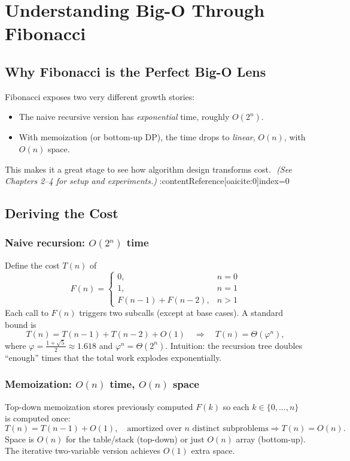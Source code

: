 \chapter{Understanding Big-O Through Fibonacci}
\label{ch:big-o-fib}

\section{Why Fibonacci is the Perfect Big-O Lens}
Fibonacci exposes two very different growth stories:
\begin{itemize}
  \item The naive recursive version has \emph{exponential} time, roughly $O(2^n)$.
  \item With memoization (or bottom-up DP), the time drops to \emph{linear}, $O(n)$, with $O(n)$ space.
\end{itemize}
This makes it a great stage to see how algorithm design transforms cost. \,\,\textit{(See Chapters 2--4 for setup and experiments.)} :contentReference[oaicite:0]{index=0}

\section{Deriving the Cost}
\subsection{Naive recursion: $O(2^n)$ time}
Define the cost $T(n)$ of
\[
F(n)=
\begin{cases}
0,& n=0\\
1,& n=1\\
F(n-1)+F(n-2),& n>1
\end{cases}
\]
Each call to $F(n)$ triggers two subcalls (except at base cases). A standard bound is
\[
T(n)=T(n-1)+T(n-2)+O(1) \quad \Rightarrow \quad T(n)=\Theta(\varphi^n),
\]
where $\varphi=\frac{1+\sqrt{5}}{2}\approx1.618$ and $\varphi^n=\Theta(2^n)$.
Intuition: the recursion tree doubles “enough” times that the total work explodes exponentially.

\subsection{Memoization: $O(n)$ time, $O(n)$ space}
Top-down memoization stores previously computed $F(k)$ so each $k\in\{0,\dots,n\}$ is computed once:
\[
T(n)=T(n-1)+O(1), \quad \text{amortized over } n \text{ distinct subproblems} \Rightarrow T(n)=O(n).
\]
Space is $O(n)$ for the table/stack (top-down) or just $O(n)$ array (bottom-up). The iterative two-variable version achieves $O(1)$ extra space.

